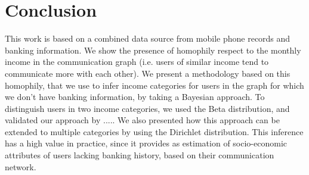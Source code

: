 \section{Conclusion}

This work is based on a combined data source 
from mobile phone records and banking information.
We show the presence of homophily respect to the monthly income in the 
communication graph (i.e. users of similar income tend to communicate more with each other).
We present a methodology based on this homophily, 
that we use to infer income categories for users in the graph for which we don't have 
banking information, by taking a Bayesian approach.
To distinguish users in two income categories, we used the Beta distribution,
and validated our approach by .....
We also presented how this approach can be extended to multiple categories by using
the Dirichlet distribution.
This inference has a high value in practice, 
since it provides as estimation of socio-economic attributes of users lacking 
banking history, based on their communication network.

